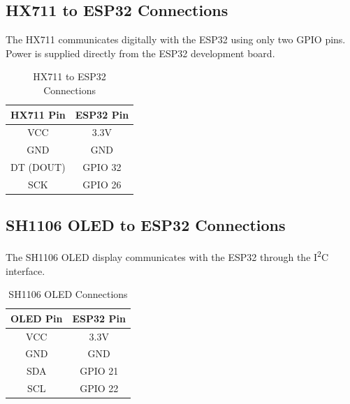 
\subsection{HX711 to ESP32 Connections}

The HX711 communicates digitally with the ESP32 using only two GPIO pins. Power is supplied directly from the ESP32 development board.

\begin{table}[H]
\centering
\caption{HX711 to ESP32 Connections}
\label{tab:hx711_esp32}

\begin{tabular}{|c|c|}
\hline
\textbf{HX711 Pin} & \textbf{ESP32 Pin} \\
\hline
VCC & 3.3V \\
GND & GND \\
DT (DOUT) & GPIO 32 \\
SCK & GPIO 26 \\
\hline
\end{tabular}

\end{table}


\subsection{SH1106 OLED to ESP32 Connections}

The SH1106 OLED display communicates with the ESP32 through the I\textsuperscript{2}C interface.

\begin{table}[H]
\centering
\caption{SH1106 OLED Connections}
\label{tab:oled_connection}

\begin{tabular}{|c|c|}
\hline
\textbf{OLED Pin} & \textbf{ESP32 Pin} \\
\hline
VCC & 3.3V \\
GND & GND \\
SDA & GPIO 21 \\
SCL & GPIO 22 \\
\hline
\end{tabular}

\end{table}


